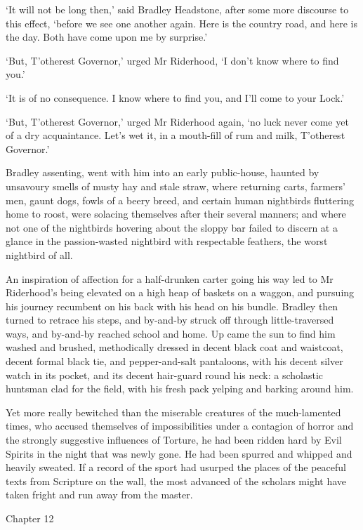 ‘It will not be long then,’ said Bradley Headstone, after some more
discourse to this effect, ‘before we see one another again. Here is the
country road, and here is the day. Both have come upon me by surprise.’

‘But, T’otherest Governor,’ urged Mr Riderhood, ‘I don’t know where to
find you.’

‘It is of no consequence. I know where to find you, and I’ll come to
your Lock.’

‘But, T’otherest Governor,’ urged Mr Riderhood again, ‘no luck never
come yet of a dry acquaintance. Let’s wet it, in a mouth-fill of rum and
milk, T’otherest Governor.’

Bradley assenting, went with him into an early public-house, haunted by
unsavoury smells of musty hay and stale straw, where returning carts,
farmers’ men, gaunt dogs, fowls of a beery breed, and certain human
nightbirds fluttering home to roost, were solacing themselves after
their several manners; and where not one of the nightbirds hovering
about the sloppy bar failed to discern at a glance in the passion-wasted
nightbird with respectable feathers, the worst nightbird of all.

An inspiration of affection for a half-drunken carter going his way led
to Mr Riderhood’s being elevated on a high heap of baskets on a waggon,
and pursuing his journey recumbent on his back with his head on his
bundle. Bradley then turned to retrace his steps, and by-and-by struck
off through little-traversed ways, and by-and-by reached school and
home. Up came the sun to find him washed and brushed, methodically
dressed in decent black coat and waistcoat, decent formal black tie, and
pepper-and-salt pantaloons, with his decent silver watch in its pocket,
and its decent hair-guard round his neck: a scholastic huntsman clad for
the field, with his fresh pack yelping and barking around him.

Yet more really bewitched than the miserable creatures of the
much-lamented times, who accused themselves of impossibilities under a
contagion of horror and the strongly suggestive influences of Torture,
he had been ridden hard by Evil Spirits in the night that was newly
gone. He had been spurred and whipped and heavily sweated. If a record
of the sport had usurped the places of the peaceful texts from Scripture
on the wall, the most advanced of the scholars might have taken fright
and run away from the master.



Chapter 12

